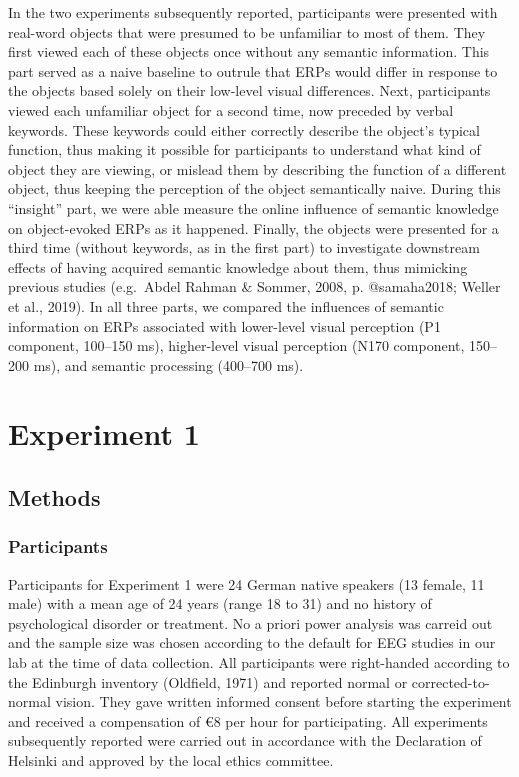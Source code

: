\documentclass[
  english,
  man,11pt,floatsintext]{apa7}
\begin{document}
In the two experiments subsequently reported, participants were presented with real-word objects that were presumed to be unfamiliar to most of them. They first viewed each of these objects once without any semantic information. This part served as a naive baseline to outrule that ERPs would differ in response to the objects based solely on their low-level visual differences. Next, participants viewed each unfamiliar object for a second time, now preceded by verbal keywords. These keywords could either correctly describe the object's typical function, thus making it possible for participants to understand what kind of object they are viewing, or mislead them by describing the function of a different object, thus keeping the perception of the object semantically naive. During this \enquote{insight} part, we were able measure the online influence of semantic knowledge on object-evoked ERPs as it happened. Finally, the objects were presented for a third time (without keywords, as in the first part) to investigate downstream effects of having acquired semantic knowledge about them, thus mimicking previous studies (e.g.~Abdel Rahman \& Sommer, 2008, p. @samaha2018; Weller et al., 2019). In all three parts, we compared the influences of semantic information on ERPs associated with lower-level visual perception (P1 component, 100--150 ms), higher-level visual perception (N170 component, 150--200 ms), and semantic processing (400--700 ms).

\hypertarget{experiment-1}{%
\section{Experiment 1}\label{experiment-1}}

\hypertarget{methods}{%
\subsection{Methods}\label{methods}}

\hypertarget{participants}{%
\subsubsection{Participants}\label{participants}}

Participants for Experiment 1 were 24 German native speakers (13 female, 11 male) with a mean age of 24 years (range 18 to 31) and no history of psychological disorder or treatment. No a priori power analysis was carreid out and the sample size was chosen according to the default for EEG studies in our lab at the time of data collection. All participants were right-handed according to the Edinburgh inventory (Oldfield, 1971) and reported normal or corrected-to-normal vision. They gave written informed consent before starting the experiment and received a compensation of €8 per hour for participating. All experiments subsequently reported were carried out in accordance with the Declaration of Helsinki and approved by the local ethics committee.
\end{document}
